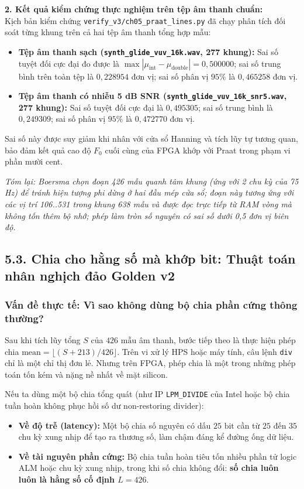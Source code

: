 \textbf{2. Kết quả kiểm chứng thực nghiệm trên tệp âm thanh chuẩn:}\\
Kịch bản kiểm chứng \texttt{verify\_v3/ch05\_praat\_lines.py} đã chạy phân tích đối soát từng khung trên cả hai tệp âm thanh tổng hợp mẫu:
\begin{itemize}[leftmargin=1.5em, itemsep=2pt]
    \item \textbf{Tệp âm thanh sạch (\texttt{synth\_glide\_vuv\_16k.wav}, 277 khung):} Sai số tuyệt đối cực đại đo được là $\max |\mu_{\text{int}} - \mu_{\text{double}}| = 0{,}500000$; sai số trung bình trên toàn tệp là $0{,}228954$ đơn vị; sai số phân vị $95\%$ là $0{,}465258$ đơn vị.
    \item \textbf{Tệp âm thanh có nhiễu 5 dB SNR (\texttt{synth\_glide\_vuv\_16k\_snr5.wav}, 277 khung):} Sai số tuyệt đối cực đại là $0{,}495305$; sai số trung bình là $0{,}249309$; sai số phân vị $95\%$ là $0{,}472770$ đơn vị.
\end{itemize}
Sai số này được suy giảm khi nhân với cửa sổ Hanning và tích lũy tự tương quan, bảo đảm kết quả cao độ $F_0$ cuối cùng của FPGA khớp với Praat trong phạm vi phần mười cent.

\textit{Tóm lại: Boersma chọn đoạn 426 mẫu quanh tâm khung (ứng với 2 chu kỳ của 75 Hz) để tránh hiện tượng phi dừng ở hai đầu mép cửa sổ; đoạn này tương ứng với các vị trí 106..531 trong khung 638 mẫu và được đọc trực tiếp từ RAM vòng mà không tốn thêm bộ nhớ; phép làm tròn số nguyên có sai số dưới 0,5 đơn vị biên độ.}

\subsection*{5.3. Chia cho hằng số mà khớp bit: Thuật toán nhân nghịch đảo Golden v2}

\subsubsection*{Vấn đề thực tế: Vì sao không dùng bộ chia phần cứng thông thường?}
Sau khi tích lũy tổng $S$ của $426\text{ mẫu}$ âm thanh, bước tiếp theo là thực hiện phép chia $\text{mean} = \lfloor (S + 213) / 426 \rfloor$. Trên vi xử lý HPS hoặc máy tính, câu lệnh \texttt{div} chỉ là một chỉ thị đơn lẻ. Nhưng trên FPGA, phép chia là một trong những phép toán tốn kém và nặng nề nhất về mặt silicon.

Nếu ta dùng một bộ chia tổng quát (như IP \texttt{LPM\_DIVIDE} của Intel hoặc bộ chia tuần hoàn không phục hồi số dư non-restoring divider):
\begin{itemize}[leftmargin=1.5em, itemsep=2pt]
    \item \textbf{Về độ trễ (latency):} Một bộ chia số nguyên có dấu $25\text{ bit}$ cần từ $25$ đến $35$ chu kỳ xung nhịp để tạo ra thương số, làm chậm đáng kể đường ống dữ liệu.
    \item \textbf{Về tài nguyên phần cứng:} Bộ chia tuần hoàn tiêu tốn nhiều phần tử logic ALM hoặc chu kỳ xung nhịp, trong khi số chia không đổi: \textbf{số chia luôn luôn là hằng số cố định $L = 426$}.
\end{itemize}


